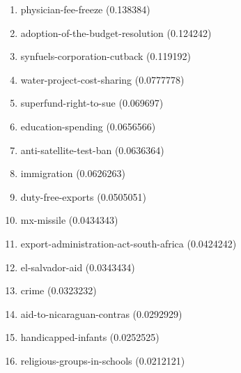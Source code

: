 \begin{enumerate}
\item physician-fee-freeze (0.138384)
\item adoption-of-the-budget-resolution (0.124242)
\item synfuels-corporation-cutback (0.119192)
\item water-project-cost-sharing (0.0777778)
\item superfund-right-to-sue (0.069697)
\item education-spending (0.0656566)
\item anti-satellite-test-ban (0.0636364)
\item immigration (0.0626263)
\item duty-free-exports (0.0505051)
\item mx-missile (0.0434343)
\item export-administration-act-south-africa (0.0424242)
\item el-salvador-aid (0.0343434)
\item crime (0.0323232)
\item aid-to-nicaraguan-contras (0.0292929)
\item handicapped-infants (0.0252525)
\item religious-groups-in-schools (0.0212121)
\end{enumerate}
